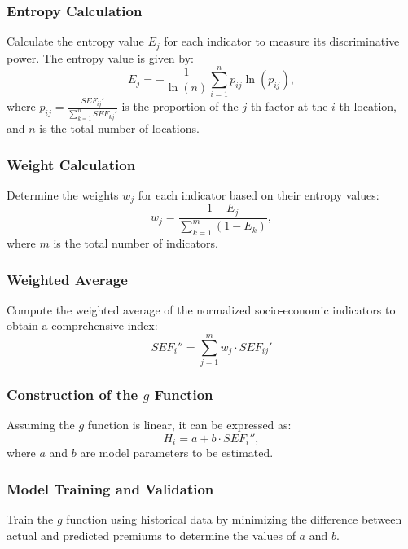 \documentclass[12pt]{article}
\begin{document}
\subsubsection{Entropy Calculation}
Calculate the entropy value $ E_j $ for each indicator to measure its discriminative power. The entropy value is given by:
\begin{equation}
    E_j = -\frac{1}{\ln(n)} \sum_{i=1}^{n} p_{ij} \ln(p_{ij}),
\end{equation}
where $ p_{ij} = \frac{SEF_{ij}'}{\sum_{k=1}^{n} SEF_{kj}'} $ is the proportion of the $ j $-th factor at the $ i $-th location, and $ n $ is the total number of locations.

\subsubsection{Weight Calculation}
Determine the weights $ w_j $ for each indicator based on their entropy values:
\begin{equation}
    w_j = \frac{1 - E_j}{\sum_{k=1}^{m} (1 - E_k)},
\end{equation}
where $ m $ is the total number of indicators.

\subsubsection{Weighted Average}
Compute the weighted average of the normalized socio-economic indicators to obtain a comprehensive index:
\begin{equation}
    SEF_i'' = \sum_{j=1}^{m} w_j \cdot SEF_{ij}'
\end{equation}


\subsubsection{Construction of the $ g $ Function}
Assuming the $ g $ function is linear, it can be expressed as:
\begin{equation}
    H_i = a + b \cdot SEF_i'',
\end{equation}
where $ a $ and $ b $ are model parameters to be estimated.

\subsubsection{Model Training and Validation}
Train the $ g $ function using historical data by minimizing the difference between actual and predicted premiums to determine the values of $ a $ and $ b $.
\end{document}
